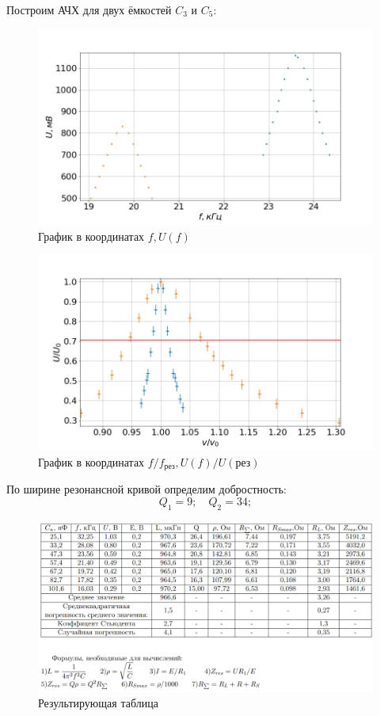\documentclass[a4paper, fontsize=14pt]{article}
\begin{document}
Построим АЧХ для двух ёмкостей $C_3$ и $C_5$:
 \begin{figure}[H]
	\caption{График в координатах $f, U(f)$}
	\center
	\includegraphics[scale=0.4]{1.jpg}
\end{figure}
 \begin{figure}[H]
	\caption{График в координатах $f/ f_\text{рез}, U(f) / U(\text{рез})$}
	\center
	\includegraphics[scale=0.4]{2.jpg}
\end{figure}
По ширине резонансной кривой определим добростность:
\[
Q_1 = 9; \quad Q_2 = 34;
\]
 \begin{figure}[H]
	\caption{Результирующая таблица}
	\center
	\includegraphics[scale=0.6]{res.png}
\end{figure}
\end{document}
